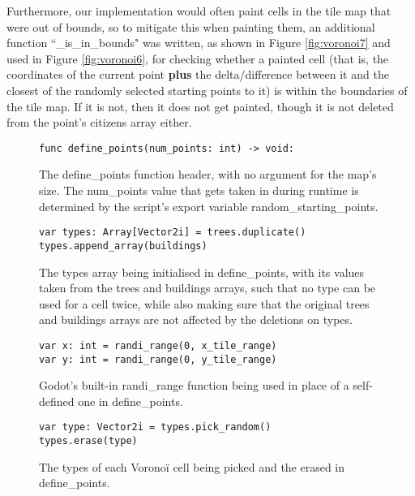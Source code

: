 Furthermore, our implementation would often paint cells in the tile map that were out of bounds, so to mitigate this when painting them, an additional function ``\_is\_in\_bounds" was written, as shown in Figure \ref{fig:voronoi7} and used in Figure \ref{fig:voronoi6}, for checking whether a painted cell (that is, the coordinates of the current point \textbf{plus} the delta/difference between it and the closest of the randomly selected starting points to it) is within the boundaries of the tile map. If it is not, then it does not get painted, though it is not deleted from the point's citizens array either.

\begin{figure}[H]
    \centering
    \begin{lstlisting}
func define_points(num_points: int) -> void:
    \end{lstlisting}
    \caption{The define\_points function header, with no argument for the map's size. The num\_points value that gets taken in during runtime is determined by the script's export variable random\_starting\_points.}
    \label{fig:voronoi1}
\end{figure}

\begin{figure}[H]
    \centering
    \begin{lstlisting}
var types: Array[Vector2i] = trees.duplicate()
types.append_array(buildings)
    \end{lstlisting}
    \caption{The types array being initialised in define\_points, with its values taken from the trees and buildings arrays, such that no type can be used for a cell twice, while also making sure that the original trees and buildings arrays are not affected by the deletions on types.}
    \label{fig:voronoi2}
\end{figure}

\begin{figure}[H]
    \centering
    \begin{lstlisting}
var x: int = randi_range(0, x_tile_range)
var y: int = randi_range(0, y_tile_range)
    \end{lstlisting}
    \caption{Godot's built-in randi\_range function being used in place of a self-defined one in define\_points.}
    \label{fig:voronoi3}
\end{figure}

\begin{figure}[H]
    \centering
    \begin{lstlisting}
var type: Vector2i = types.pick_random()
types.erase(type)
    \end{lstlisting}
    \caption{The types of each Voronoï cell being picked and the erased in define\_points.}
    \label{fig:voronoi4}
\end{figure}

